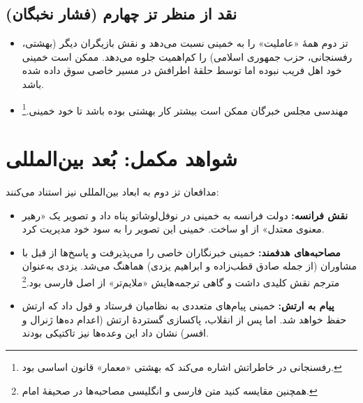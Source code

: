 \documentclass[12pt,a4paper]{book}
\newcommand{\en}[1]{\lr{\textit{#1}}}
\begin{document}
\subsection{نقد از منظر تز چهارم (فشار نخبگان)}

\begin{itemize}[label=\textcolor{cConsolid}{$\checkmark$}, rightmargin=2em]
    \item تز دوم همهٔ «عاملیت» را به خمینی نسبت می‌دهد و نقش بازیگران دیگر (بهشتی، رفسنجانی، حزب جمهوری اسلامی) را کم‌اهمیت جلوه می‌دهد. ممکن است خمینی خود اهل فریب نبوده اما توسط حلقهٔ اطرافش در مسیر خاصی سوق داده شده باشد.
    \item مهندسی مجلس خبرگان ممکن است بیشتر کار بهشتی بوده باشد تا خود خمینی.\footnote{رفسنجانی در خاطراتش اشاره می‌کند که بهشتی «معمار» قانون اساسی بود.}
\end{itemize}

\section{شواهد مکمل: بُعد بین‌المللی}

مدافعان تز دوم به ابعاد بین‌المللی نیز استناد می‌کنند:

\begin{itemize}[label=\textcolor{cPrimary}{$\blacktriangleright$}, rightmargin=2em]
    \item \textbf{نقش فرانسه:} دولت فرانسه به خمینی در نوفل‌لوشاتو پناه داد و تصویر یک «رهبر معنوی معتدل» از او ساخت. خمینی این تصویر را به سود خود مدیریت کرد.
    
    \item \textbf{مصاحبه‌های هدفمند:} خمینی خبرنگاران خاصی را می‌پذیرفت و پاسخ‌ها از قبل با مشاوران (از جمله صادق قطب‌زاده و ابراهیم یزدی) هماهنگ می‌شد. یزدی به‌عنوان مترجم نقش کلیدی داشت و گاهی ترجمه‌هایش «ملایم‌تر» از اصل فارسی بود.\footnote{\en{Moin (1999), pp.\,185--188.} همچنین مقایسه کنید متن فارسی و انگلیسی مصاحبه‌ها در صحیفهٔ امام.}
    
    \item \textbf{پیام به ارتش:} خمینی پیام‌های متعددی به نظامیان فرستاد و قول داد که ارتش حفظ خواهد شد. اما پس از انقلاب، پاکسازی گستردهٔ ارتش (اعدام ده‌ها ژنرال و افسر) نشان داد این وعده‌ها نیز تاکتیکی بودند.
\end{itemize}
\end{document}
